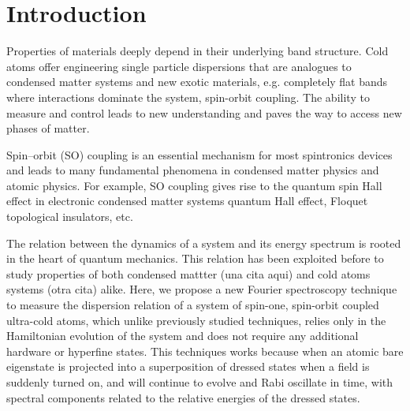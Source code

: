 \section{Introduction}


Properties of materials deeply depend in their underlying band structure. Cold atoms offer engineering single particle dispersions that are analogues to condensed matter systems and new exotic materials, e.g. completely flat bands where interactions dominate the system, spin-orbit coupling. The ability to measure and control leads to new understanding and paves the way to access new phases of matter. 


Spin–orbit (SO) coupling is an essential mechanism for most
spintronics devices and leads to many fundamental phenomena
in condensed matter physics and atomic physics. For example,
SO coupling gives rise to the quantum spin Hall effect in
electronic condensed matter systems
quantum Hall effect, Floquet topological insulators, etc. 


The relation between the dynamics of a system and its energy spectrum is rooted in the heart of quantum mechanics.  This relation has been exploited before to study properties of both condensed mattter (una cita aqui) and cold atoms systems (otra cita) alike. Here, we propose a new Fourier spectroscopy technique to measure the dispersion relation of a system of spin-one, spin-orbit coupled ultra-cold atoms, which unlike previously studied techniques, relies only in the Hamiltonian evolution of the system and does not require any additional hardware or hyperfine states. This techniques works because when an atomic bare eigenstate is projected into a superposition of dressed states when a field is suddenly turned on, and will continue to evolve and Rabi oscillate in time, with spectral components related to the relative energies of the dressed states. 








